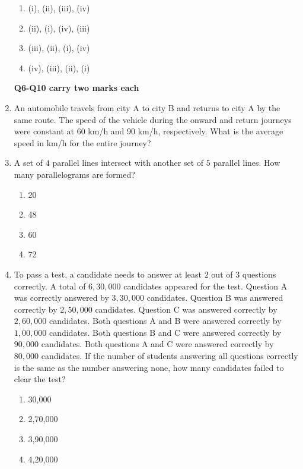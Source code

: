 \documentclass[journal,12pt,onecolumn]{IEEEtran}
\theoremstyle{remark}
\begin{document}
\begin{enumerate}
    \begin{enumerate}
        \item (i), (ii), (iii), (iv)
        \item (ii), (i), (iv), (iii)
        \item (iii), (ii), (i), (iv)
        \item (iv), (iii), (ii), (i)
    \end{enumerate}
    \textbf{Q6-Q10 carry two marks each}
    \item An automobile travels from city A to city B and returns to city A by the same route. The speed of the vehicle during the onward and return journeys were constant at 60 km/h and 90 km/h, respectively. What is the average speed in km/h for the entire journey?
    \begin{enumerate}
 \end{enumerate}
    \item A set of $4$ parallel lines intersect with another set of $5$ parallel lines. How many parallelograms are formed?
    \begin{multicols}{4}
    \begin{enumerate}
        \item 20
        \item 48
        \item 60
        \item 72
    \end{enumerate}
    \end{multicols}

    \item To pass a test, a candidate needs to answer at least $2$ out of $3$ questions correctly. A total of $6,30,000$ candidates appeared for the test. Question A was correctly answered by $3,30,000$ candidates. Question B was answered correctly by $2,50,000$ candidates. Question C was answered correctly by $2,60,000$ candidates. Both questions A and B were answered correctly by $1,00,000$ candidates. Both questions B and C were answered correctly by $90,000$ candidates. Both questions A and C were answered correctly by $80,000$ candidates. If the number of students answering all questions correctly is the same as the number answering none, how many candidates failed to clear the test?
    \begin{multicols}{4}
    \begin{enumerate}
        \item 30,000
        \item 2,70,000
        \item 3,90,000
        \item 4,20,000
    \end{enumerate}
    \end{multicols}


\end{enumerate}
\end{document}
